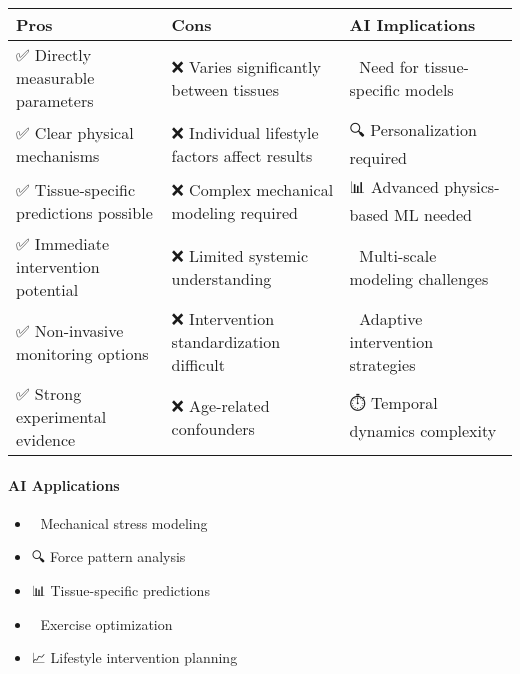 \begin{longtable}[]{@{}
  >{\raggedright\arraybackslash}p{}
  >{\raggedright\arraybackslash}p{}
  >{\raggedright\arraybackslash}p{}@{}}
\toprule\noalign{}
\begin{minipage}[b]{\linewidth}\raggedright
Pros
\end{minipage} & \begin{minipage}[b]{\linewidth}\raggedright
Cons
\end{minipage} & \begin{minipage}[b]{\linewidth}\raggedright
AI Implications
\end{minipage} \\
\midrule\noalign{}
\endhead
\bottomrule\noalign{}
\endlastfoot
✅ Directly measurable parameters & ❌ Varies significantly between
tissues & 🤖 Need for tissue-specific models \\
✅ Clear physical mechanisms & ❌ Individual lifestyle factors affect
results & 🔍 Personalization required \\
✅ Tissue-specific predictions possible & ❌ Complex mechanical modeling
required & 📊 Advanced physics-based ML needed \\
✅ Immediate intervention potential & ❌ Limited systemic understanding
& 🧬 Multi-scale modeling challenges \\
✅ Non-invasive monitoring options & ❌ Intervention standardization
difficult & 🎯 Adaptive intervention strategies \\
✅ Strong experimental evidence & ❌ Age-related confounders & ⏱️
Temporal dynamics complexity \\
\end{longtable}

\paragraph{AI Applications}\label{ai-applications-1}

\begin{itemize}
\tightlist
\item
  🤖 Mechanical stress modeling
\item
  🔍 Force pattern analysis
\item
  📊 Tissue-specific predictions
\item
  💪 Exercise optimization
\item
  📈 Lifestyle intervention planning
\end{itemize}


